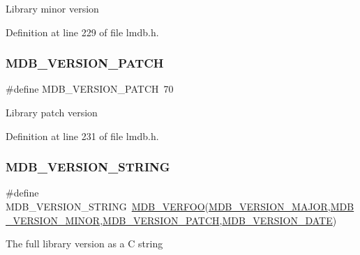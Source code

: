 Library minor version 

Definition at line 229 of file lmdb.\+h.

\mbox{\label{group___version_gaeddac7231e1cdcbe2b7541cbfa33e82a}} 
\subsubsection{\texorpdfstring{M\+D\+B\+\_\+\+V\+E\+R\+S\+I\+O\+N\+\_\+\+P\+A\+T\+CH}{MDB\_VERSION\_PATCH}}
{\footnotesize\ttfamily \#define M\+D\+B\+\_\+\+V\+E\+R\+S\+I\+O\+N\+\_\+\+P\+A\+T\+CH~70}

Library patch version 

Definition at line 231 of file lmdb.\+h.

\mbox{\label{group___version_ga44546ec3a3ab85addf079124ef4af21e}} 
\subsubsection{\texorpdfstring{M\+D\+B\+\_\+\+V\+E\+R\+S\+I\+O\+N\+\_\+\+S\+T\+R\+I\+NG}{MDB\_VERSION\_STRING}}
{\footnotesize\ttfamily \#define M\+D\+B\+\_\+\+V\+E\+R\+S\+I\+O\+N\+\_\+\+S\+T\+R\+I\+NG~\mbox{\hyperlink{group___version_ga9e259368ceadd84622c214f0c7442970}{M\+D\+B\+\_\+\+V\+E\+R\+F\+OO}}(\mbox{\hyperlink{group___version_ga4d29d48a85ec25636fac7831b8b9b807}{M\+D\+B\+\_\+\+V\+E\+R\+S\+I\+O\+N\+\_\+\+M\+A\+J\+OR}},\mbox{\hyperlink{group___version_ga44da0474969d76ad5521f8b7de4dd32f}{M\+D\+B\+\_\+\+V\+E\+R\+S\+I\+O\+N\+\_\+\+M\+I\+N\+OR}},\mbox{\hyperlink{group___version_gaeddac7231e1cdcbe2b7541cbfa33e82a}{M\+D\+B\+\_\+\+V\+E\+R\+S\+I\+O\+N\+\_\+\+P\+A\+T\+CH}},\mbox{\hyperlink{group___version_ga24212e54d8dc0e0949970b5995b3b663}{M\+D\+B\+\_\+\+V\+E\+R\+S\+I\+O\+N\+\_\+\+D\+A\+TE}})}

The full library version as a C string 

